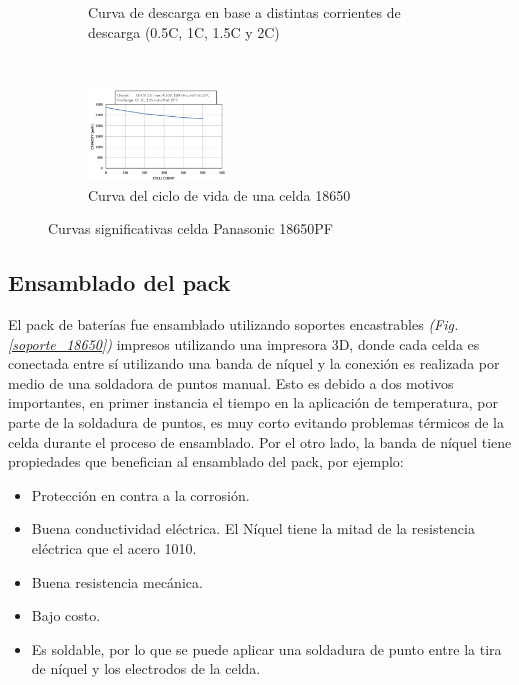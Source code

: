 \documentclass[10pt, a4paper]{report}
\begin{document}
\begin{figure}[h!]
\begin{subfigure}[t]{.5\textwidth}
	\caption{Curva de descarga en base a distintas corrientes de descarga (0.5C,
	1C, 1.5C y 2C)}
	\label{descarga_18650}
    \end{subfigure}
    ~ 
    \begin{centering}
	\begin{subfigure}[t]{1\textwidth}
	    \centering
	    \includegraphics[width=0.4\textwidth]{life_cycle_18650.png}
	    \caption{Curva del ciclo de vida de una celda 18650}
        \label{life_cycle_18650}
	\end{subfigure}
    \end{centering}
    \caption{Curvas significativas celda Panasonic 18650PF}
    \label{curvas_sign_18650}
\end{figure}
\FloatBarrier

\subsection{Ensamblado del pack}

El pack de bater\'ias fue ensamblado utilizando soportes encastrables
\emph{(Fig.  \ref{soporte_18650})} impresos utilizando una impresora 3D, donde
cada celda es conectada entre s\'i utilizando una banda de níquel y la
conexi\'on es realizada por medio de una soldadora de puntos manual. Esto es
debido a dos motivos importantes, en primer instancia el tiempo en la
aplicaci\'on de temperatura, por parte de la soldadura de puntos, es muy corto
evitando problemas t\'ermicos de la celda durante el proceso de ensamblado. Por
el otro lado, la banda de níquel tiene propiedades que benefician al ensamblado
del pack, por ejemplo:

\begin{itemize}
    \item Protecci\'on en contra a la corrosi\'on.
    \item Buena conductividad el\'ectrica. El N\'iquel tiene la mitad de la
        resistencia el\'ectrica que el acero 1010.
    \item Buena resistencia mec\'anica.
    \item Bajo costo.
    \item Es soldable, por lo que se puede aplicar una soldadura de punto entre
        la tira de n\'iquel y los electrodos de la celda.
\end{itemize}
\end{document}
